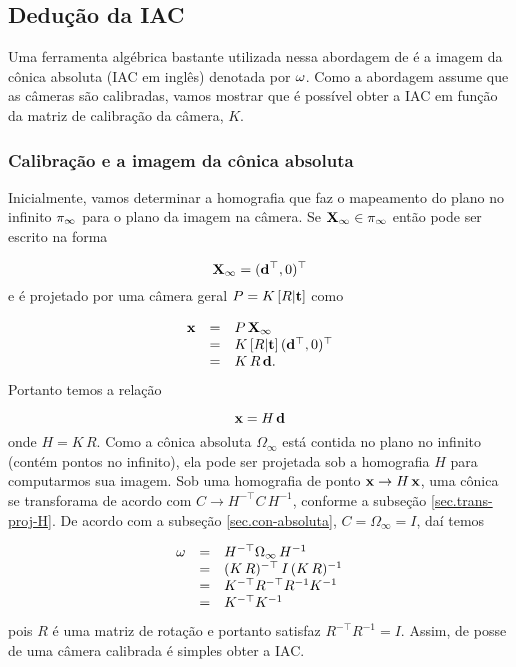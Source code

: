 \subsection{Dedução da IAC}

Uma ferramenta algébrica bastante utilizada nessa abordagem de \citep{2503343} é a imagem da cônica absoluta (IAC em inglês) denotada por ${\bf \omega}$. Como a abordagem assume que as câmeras são calibradas, vamos mostrar que é possível obter a IAC em função da matriz de calibração da câmera, $K$.

\subsubsection{Calibração e a imagem da cônica absoluta}\label{sec.omega-calibracao}

 Inicialmente, vamos determinar a homografia que faz o mapeamento do plano no infinito $\pi_\infty$ para o plano da imagem na câmera. Se $\mathbf{X}_\infty\in\pi_\infty$ então pode ser escrito na forma

\begin{equation*}
\mathbf{X}_\infty=({\bf d}^\top,0)^\top
\end{equation*} 
e é projetado por uma câmera geral $P=K\,[R|{\bf t}]$ como

\begin{equation*}
\begin{array}{rcl}
\mathbf{x}&=&P\,\mathbf{X}_\infty\\
&=&K\,[R|{\bf t}]\,({\bf d}^\top,0)^\top\\
&=&K\,R\,{\bf d}.
\end{array}
\end{equation*}
Portanto temos a relação

\begin{equation*}
\mathbf{x}=H\,{\bf d}
\end{equation*}
onde $H=K\,R$. Como a cônica absoluta $\Omega_\infty$ está contida no plano no infinito (contém pontos no infinito), ela pode ser projetada sob a homografia $H$ para computarmos sua imagem.
Sob uma homografia de ponto $\mathbf{x}\rightarrow H\,\mathbf{x}$, uma cônica se transforama de acordo com $C\rightarrow H^{-\top} C\,H^{-1}$, conforme a subseção \ref{sec.trans-proj-H}. De acordo com a subseção \ref{sec.con-absoluta}, $C=\Omega_\infty =I$, daí temos

\begin{equation*}
\begin{array}{rcl}
{\bf \omega}&=&H^{-\top}\Omega_\infty\,H^{-1}\\
&=&(K\,R)^{-\top}\,I\,(K\,R)^{-1}\\
&=&K^{-\top}R^{-\top}R^{-1}K^{-1}\\
&=&K^{-\top}K^{-1}
\end{array}
\end{equation*}
pois $R$ é uma matriz de rotação e portanto satisfaz $R^{-\top}R^{-1}=I$. Assim, de posse de uma câmera calibrada é simples obter a IAC.

